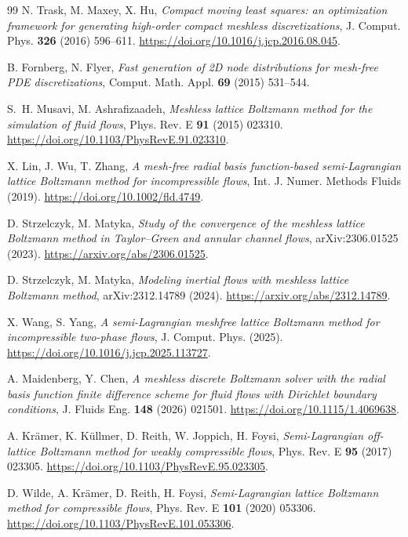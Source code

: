 \documentclass[11pt,a4paper]{article}
\begin{document}
\begin{thebibliography}{99}
N. Trask, M. Maxey, X. Hu,
\emph{Compact moving least squares: an optimization framework for generating
high-order compact meshless discretizations},
J. Comput. Phys. \textbf{326} (2016) 596--611.
\url{https://doi.org/10.1016/j.jcp.2016.08.045}.

B. Fornberg, N. Flyer,
\emph{Fast generation of 2D node distributions for mesh-free PDE discretizations},
Comput. Math. Appl. \textbf{69} (2015) 531--544.

S.~H. Musavi, M. Ashrafizaadeh,
\emph{Meshless lattice Boltzmann method for the simulation of fluid flows},
Phys. Rev. E \textbf{91} (2015) 023310.
\url{https://doi.org/10.1103/PhysRevE.91.023310}.

X. Lin, J. Wu, T. Zhang,
\emph{A mesh-free radial basis function-based semi-Lagrangian lattice Boltzmann method
for incompressible flows},
Int. J. Numer. Methods Fluids (2019).
\url{https://doi.org/10.1002/fld.4749}.

D. Strzelczyk, M. Matyka,
\emph{Study of the convergence of the meshless lattice Boltzmann method in
Taylor--Green and annular channel flows}, arXiv:2306.01525 (2023).
\url{https://arxiv.org/abs/2306.01525}.

D. Strzelczyk, M. Matyka,
\emph{Modeling inertial flows with meshless lattice Boltzmann method},
arXiv:2312.14789 (2024).
\url{https://arxiv.org/abs/2312.14789}.

X. Wang, S. Yang,
\emph{A semi-Lagrangian meshfree lattice Boltzmann method for incompressible two-phase
flows}, J. Comput. Phys. (2025).
\url{https://doi.org/10.1016/j.jcp.2025.113727}.

A. Maidenberg, Y. Chen,
\emph{A meshless discrete Boltzmann solver with the radial basis function finite
difference scheme for fluid flows with Dirichlet boundary conditions},
J. Fluids Eng. \textbf{148} (2026) 021501.
\url{https://doi.org/10.1115/1.4069638}.

A. Kr\"amer, K. K\"ullmer, D. Reith, W. Joppich, H. Foysi,
\emph{Semi-Lagrangian off-lattice Boltzmann method for weakly compressible flows},
Phys. Rev. E \textbf{95} (2017) 023305.
\url{https://doi.org/10.1103/PhysRevE.95.023305}.

D. Wilde, A. Kr\"amer, D. Reith, H. Foysi,
\emph{Semi-Lagrangian lattice Boltzmann method for compressible flows},
Phys. Rev. E \textbf{101} (2020) 053306.
\url{https://doi.org/10.1103/PhysRevE.101.053306}.


\end{thebibliography}
\end{document}
